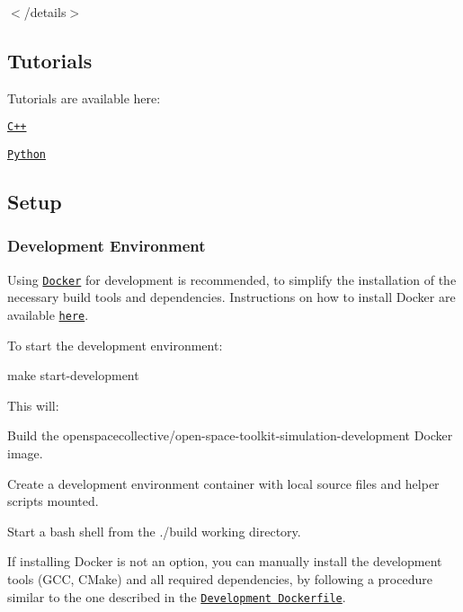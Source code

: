 $<$/details$>$

\subsection*{Tutorials}

Tutorials are available here\+:


\begin{DoxyItemize}
\item \href{./tutorials/cpp}{\tt C++}
\item \href{./tutorials/python}{\tt Python}
\end{DoxyItemize}

\subsection*{Setup}

\subsubsection*{Development Environment}

Using \href{https://www.docker.com}{\tt Docker} for development is recommended, to simplify the installation of the necessary build tools and dependencies. Instructions on how to install Docker are available \href{https://docs.docker.com/install/}{\tt here}.

To start the development environment\+:


\begin{DoxyCode}
make start-development
\end{DoxyCode}


This will\+:


\begin{DoxyEnumerate}
\item Build the {\ttfamily openspacecollective/open-\/space-\/toolkit-\/simulation-\/development} Docker image.
\item Create a development environment container with local source files and helper scripts mounted.
\item Start a {\ttfamily bash} shell from the {\ttfamily ./build} working directory.
\end{DoxyEnumerate}

If installing Docker is not an option, you can manually install the development tools (G\+CC, C\+Make) and all required dependencies, by following a procedure similar to the one described in the \href{./docker/development/Dockerfile}{\tt Development Dockerfile}.

